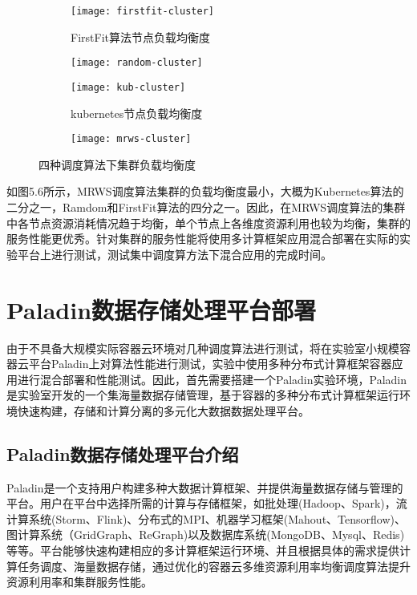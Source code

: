 \begin{figure}[H]
	\centering%
	\begin{subfigure}{7cm}
		\texttt{[image: firstfit-cluster]}
		\caption{FirstFit算法节点负载均衡度}
	\end{subfigure}%
	\hspace{0.5cm}%
	\begin{subfigure}{7cm}
		\texttt{[image: random-cluster]}
	\end{subfigure}
	\begin{subfigure}{7cm}
		\texttt{[image: kub-cluster]}
		\caption{kubernetes节点负载均衡度}
	\end{subfigure}%
	\hspace{0.5cm}%
	\begin{subfigure}{7cm}
		\texttt{[image: mrws-cluster]}
	\end{subfigure}
	\caption{四种调度算法下集群负载均衡度}	
\end{figure}

如图5.6所示，MRWS调度算法集群的负载均衡度最小，大概为Kubernetes算法的二分之一，Ramdom和FirstFit算法的四分之一。因此，在MRWS调度算法的集群中各节点资源消耗情况趋于均衡，单个节点上各维度资源利用也较为均衡，集群的服务性能更优秀。针对集群的服务性能将使用多计算框架应用混合部署在实际的实验平台上进行测试，测试集中调度算方法下混合应用的完成时间。

\section{Paladin数据存储处理平台部署}
由于不具备大规模实际容器云环境对几种调度算法进行测试，将在实验室小规模容器云平台Paladin上对算法性能进行测试，实验中使用多种分布式计算框架容器应用进行混合部署和性能测试。因此，首先需要搭建一个Paladin实验环境，Paladin是实验室开发的一个集海量数据存储管理，基于容器的多种分布式计算框架运行环境快速构建，存储和计算分离的多元化大数据数据处理平台。
\subsection{Paladin数据存储处理平台介绍}
Paladin是一个支持用户构建多种大数据计算框架、并提供海量数据存储与管理的平台。用户在平台中选择所需的计算与存储框架，如批处理(Hadoop、Spark)，流计算系统(Storm、Flink)、分布式的MPI、机器学习框架(Mahout、Tensorflow)、图计算系统（GridGraph、ReGraph)以及数据库系统(MongoDB、Mysql、Redis)等等。平台能够快速构建相应的多计算框架运行环境、并且根据具体的需求提供计算任务调度、海量数据存储，通过优化的容器云多维资源利用率均衡调度算法提升资源利用率和集群服务性能。

